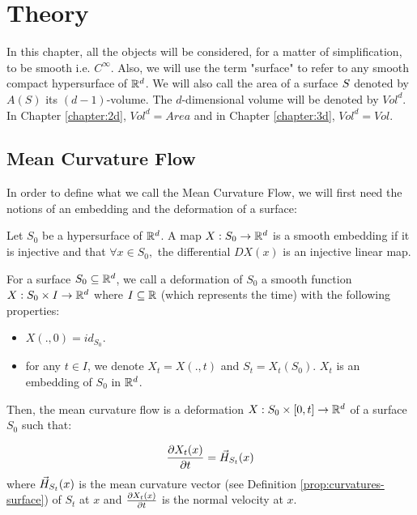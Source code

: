 \chapter{Theory}
\label{chapter:theory}

In this chapter, all the objects will be considered, for a matter of
simplification, to be smooth i.e. $ C^\infty $. Also, we will use the term
"surface" to refer to any smooth compact hypersurface of $ \mathbb{R}^d $. We will also
call the area of a surface $ S $ denoted by $ A(S) $ its $ (d-1)
$-volume. The $ d $-dimensional volume will be denoted by $ Vol^d $. In Chapter
\ref{chapter:2d}, $ Vol^d = Area $ and in Chapter \ref{chapter:3d}, $ Vol^d =
Vol $.

\section{Mean Curvature Flow}

In order to define what we call the Mean Curvature Flow, we will
first need the notions of an embedding and the deformation of a surface:

\begin{definition}
    Let $ S_0 $ be a hypersurface of $ \mathbb{R}^d $. A map $ X: S_0 \to \mathbb{R}^d $ is a
    smooth embedding if it is injective and that $ \forall x\in S_0, $ the
    differential $ D X(x) $ is an injective linear map.
\end{definition}

\begin{definition}
    For a surface $ S_0 \subseteq \mathbb{R}^d $, we call a deformation of $ S_0 $ a
    smooth function $ X : S_0 \times I \to \mathbb{R}^d $ where $ I \subseteq \mathbb{R} $
    (which represents the time) with the following properties:
    \begin{itemize}
        \item $ X(., 0) = id_{S_0} $.
        \item for any $ t \in I $, we denote $ X_t = X(., t) $ and $ S_t =
            X_t(S_0) $. $ X_t $ is an embedding of $ S_0 $ in $ \mathbb{R}^d $.
    \end{itemize}
\end{definition}

Then, the mean curvature flow is a deformation $ X : S_0 \times [0, t] \to \mathbb{R}^d
$ of a surface $ S_0 $ such that:

\begin{equation}
    \frac{\partial{X_t(x)}}{\partial{t}} = \vec{H}_{S_t}(x)
    \label{eqn:mean-curvature-flow}
\end{equation}
where $ \vec{H}_{S_t}(x) $ is the mean curvature vector (see Definition
\ref{prop:curvatures-surface}) of $ S_t $ at $ x $ and $ \frac{\partial{X_t(x)}}{\partial{t}} $
is the normal velocity at $ x $.

